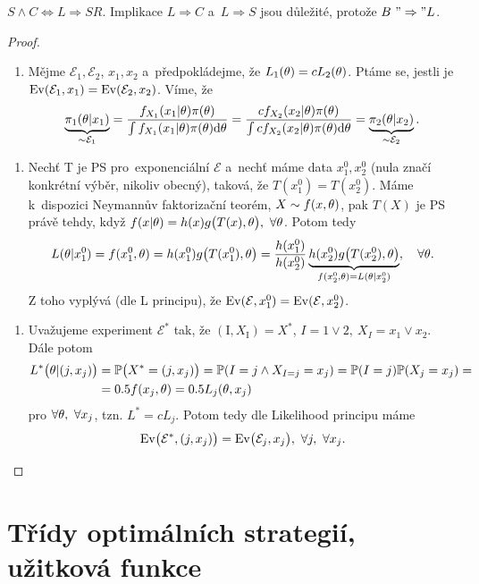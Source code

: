 \begin{theorem}
	$S\wedge C\Leftrightarrow L\Rightarrow SR$. Implikace $L\Rightarrow C$ a~$L\Rightarrow S$ jsou důležité, protože $B~"\Rightarrow" L$.
	\begin{proof}
		\begin{enumerate}[$B"\Rightarrow"L$:]
			\item Mějme $\mathcal{E}_1,\mathcal{E}_2$, $x_1,x_2$ a~předpokládejme, že $L_1(\theta)=c L_2(\theta)$. Ptáme se, jestli je $\mathrm{Ev}(\mathcal{E}_1,x_1)=\mathrm{Ev}(\mathcal{E}_2,x_2)$. Víme, že $$ \underbrace{\pi_1(\theta|x_1)}_{\sim\mathcal{E}_1}=\frac{f_{X_1}(x_1|\theta)\pi(\theta)}{\int f_{X_1}(x_1|\theta)\pi(\theta)\mathrm{d}\theta}=\frac{c f_{X_2}(x_2|\theta)\pi(\theta)}{\int c f_{X_2}(x_2|\theta)\pi(\theta)\mathrm{d}\theta}=\underbrace{\pi_2(\theta| x_2)}_{\sim\mathcal{E}_2}.$$
		\end{enumerate}
		\begin{enumerate}[$L\Rightarrow S$:]
			\item Nechť T je PS pro~exponenciální $\mathcal{E}$ a~nechť máme data $x_1^0,x_2^0$ (nula značí konkrétní výběr, nikoliv obecný), taková, že $T(x_1^0)=T(x_2^0)$. Máme k~dispozici Neymannův faktorizační teorém, $X\sim f(x,\theta)$, pak $T(X)$ je PS právě tehdy, když $f(x|\theta)=h(x)g\big(T(x),\theta \big),~\forall\theta$. Potom tedy 
			$$ L(\theta|x_1^0)=f(x_1^0,\theta)=h(x_1^0)g\big( T(x_1^0),\theta \big)=\frac{h(x_1^0)}{h(x_2^0)}\underbrace{h(x_2^0)g\big(T(x_2^0),\theta \big)}_{f(x_2^0,\theta)=L(\theta|x_2^0)},\quad\forall\theta.$$
			Z toho vyplývá (dle L principu), že $\mathrm{Ev}(\mathcal{E},x_1^0)=\mathrm{Ev}(\mathcal{E},x_2^0)$.
		\end{enumerate}
		\begin{enumerate}[$L\Rightarrow C$:]
			\item Uvažujeme experiment $\mathcal{E}^*$ tak, že $(\mathrm{I},X_\mathrm{I})=X^*$, $I=1\vee 2,~X_I=x_1\vee x_2$. 
			Dále potom \[
			\begin{split}
			L^*\big(\theta|(j,x_j)\big)&=\mathbb{P}\big(X^*=(j,x_j) \big)=\mathbb{P}(I=j\wedge X_{I=j}=x_j)=\mathbb{P}(I=j)\mathbb{P}(X_j=x_j)=\\&=0.5f(x_j,\theta)=0.5 L_j(\theta,x_j)
			\end{split}
			\]
			pro $\forall\theta,~\forall x_j$, tzn. $L^*=c L_j$. Potom tedy dle Likelihood principu máme $$\mathrm{Ev}\big(\mathcal{E}^*,(j,x_j) \big)=\mathrm{Ev}\big(\mathcal{E}_j,x_j \big),~\forall j,~\forall x_j.$$
		\end{enumerate}
	\end{proof}
\end{theorem}

\chapter{Třídy optimálních strategií, užitková funkce}

